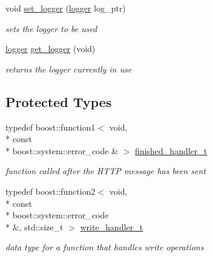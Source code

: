 \begin{DoxyCompactItemize}
void \hyperlink{classpion_1_1http_1_1writer_a25f0a6f75c22eb95d619ae600c0f2121}{set\-\_\-logger} (\hyperlink{structpion_1_1logger}{logger} log\-\_\-ptr)
\begin{DoxyCompactList}\small\item\em sets the logger to be used \end{DoxyCompactList}\item 
\hyperlink{structpion_1_1logger}{logger} \hyperlink{classpion_1_1http_1_1writer_a58c000ca432c7c168ebd666f4bd17c30}{get\-\_\-logger} (void)
\begin{DoxyCompactList}\small\item\em returns the logger currently in use \end{DoxyCompactList}\end{DoxyCompactItemize}
\subsection*{Protected Types}
\begin{DoxyCompactItemize}
\item 
typedef boost\-::function1$<$ void, \\*
const \\*
boost\-::system\-::error\-\_\-code \& $>$ \hyperlink{classpion_1_1http_1_1writer_a7e3ce4b88e0427adf673a99fca3af982}{finished\-\_\-handler\-\_\-t}
\begin{DoxyCompactList}\small\item\em function called after the H\-T\-T\-P message has been sent \end{DoxyCompactList}\item 
typedef boost\-::function2$<$ void, \\*
const \\*
boost\-::system\-::error\-\_\-code \\*
\&, std\-::size\-\_\-t $>$ \hyperlink{classpion_1_1http_1_1writer_a36fa31c850362d907559a0c1157a1bf3}{write\-\_\-handler\-\_\-t}
\begin{DoxyCompactList}\small\item\em data type for a function that handles write operations \end{DoxyCompactList}\end{DoxyCompactItemize}
